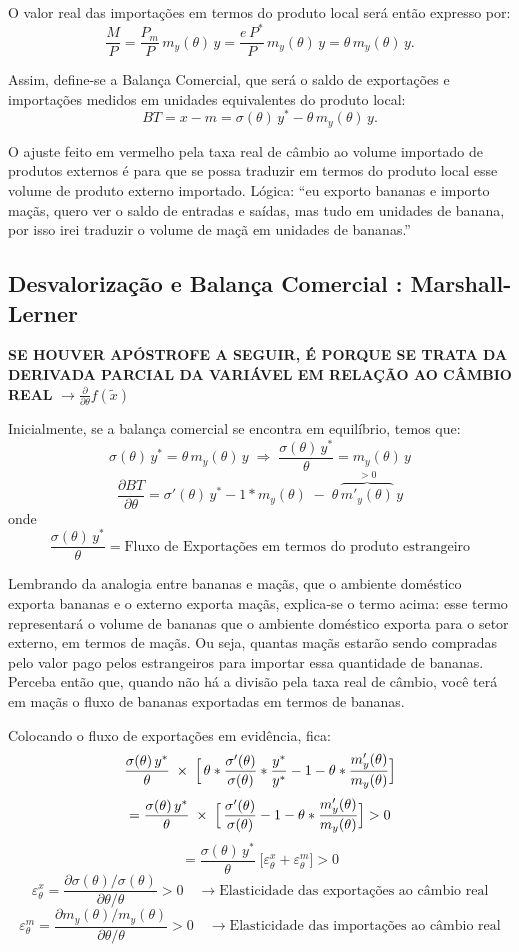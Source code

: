 \documentclass[a4paper,12pt]{article}[abntex2]
\begin{document}
O valor real das importações em termos do produto local será então expresso por:
\[
\frac{M}{P} = \frac{P_m}{P}\,m_y(\theta)\,y
= \frac{e\,P^*}{P}\,m_y(\theta)\,y
= \theta\,m_y(\theta)\,y.
\]

Assim, define-se a Balança Comercial, que será o saldo de exportações e importações medidos em unidades equivalentes do produto local:
\[
BT = x - m = \sigma(\theta)\,y^* - \theta\,m_y(\theta)\,y.
\]

O ajuste feito em vermelho pela taxa real de câmbio ao volume importado de produtos externos é para que se possa traduzir em termos do produto local esse volume de produto externo importado. Lógica: “eu exporto bananas e importo maçãs, quero ver o saldo de entradas e saídas, mas tudo em unidades de banana, por isso irei traduzir o volume de maçã em unidades de bananas.”

\subsection{\textbf{Desvalorização e Balança Comercial : Marshall-Lerner}}

\textbf{SE HOUVER APÓSTROFE A SEGUIR, É PORQUE SE TRATA DA DERIVADA PARCIAL DA VARIÁVEL EM RELAÇÃO AO CÂMBIO REAL} \( \rightarrow \frac{\partial}{\partial \theta}f(\tilde{x})\)

Inicialmente, se a balança comercial se encontra em equilíbrio, temos que:  
\[
\sigma(\theta)\,y^* = \theta\,m_{y}(\theta)\,y
\;\Longrightarrow\;
\frac{\sigma(\theta)\,y^*}{\theta} = m_{y}(\theta)\,y
\]
\[
\frac{\partial BT}{\partial \theta}
= \sigma'(\theta)\,y^* - 1 * m_{y}(\theta)\;-\;\theta\,\overbrace{m'_{y}(\theta)}^{>0}\,y
\]
onde
\[
\frac{\sigma(\theta)\,y^*}{\theta}
= \text{Fluxo de Exportações em termos do produto estrangeiro}
\]

Lembrando da analogia entre bananas e maçãs, que o ambiente doméstico exporta bananas e o externo exporta maçãs, explica‐se o termo acima: esse termo representará o volume de bananas que o ambiente doméstico exporta para o setor externo, em termos de maçãs. Ou seja, quantas maçãs estarão sendo compradas pelo valor pago pelos estrangeiros para importar essa quantidade de bananas. Perceba então que, quando não há a divisão pela taxa real de câmbio, você terá em maçãs o fluxo de bananas exportadas em termos de bananas.

Colocando o fluxo de exportações em evidência, fica:
\[
\frac{\sigma(\theta)\,y^*}{\theta}
\;\times\;
\Bigl[\,
\theta * \frac{\sigma'(\theta)}{\sigma(\theta)} * \frac{y^*}{y^*}
 - 1
 - \theta * \frac{m'_{y}(\theta)}{m_{y}(\theta)}
\Bigr]
\]
\[
=
\frac{\sigma(\theta)\,y^*}{\theta}
\;\times\;
\Bigl[\,
\frac{\sigma'(\theta)}{\sigma(\theta)}
 - 1
 - \theta * \frac{m'_{y}(\theta)}{m_{y}(\theta)}
\Bigr]
> 0
\]
\[
= \frac{\sigma(\theta)\,y^*}{\theta}
 \;\bigl[\varepsilon^{x}_{\theta} + \varepsilon^{m}_{\theta}\bigr]
> 0
\]
\[
\varepsilon^{x}_{\theta}
= \frac{\partial \sigma(\theta)/\sigma(\theta)}{\partial \theta/\theta} > 0
\quad\to\text{Elasticidade das exportações ao câmbio real}
\]
\[
\varepsilon^{m}_{\theta}
= \frac{\partial m_{y}(\theta)/m_{y}(\theta)}{\partial \theta/\theta} > 0
\quad\to\text{Elasticidade das importações ao câmbio real}
\]
\end{document}
